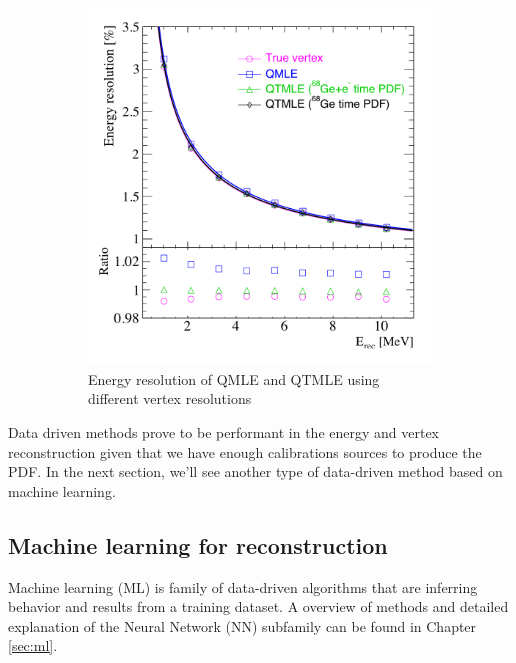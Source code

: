 \documentclass[../main.tex]{subfiles}
\begin{document}
\begin{figure}[ht]
\begin{subfigure}{0.48\linewidth}
    \includegraphics[width=\textwidth]{images/juno/reco/energy_qtmle.png}
    \caption{Energy resolution of QMLE and QTMLE using different vertex resolutions}
  \end{subfigure}
  \caption{}
  \label{fig:juno:rec:qtmle}
\end{figure}

Data driven methods prove to be performant in the energy and vertex reconstruction given that we have enough calibrations sources to produce the PDF. In the next section, we'll see another type of data-driven method based on machine learning.

\subsection{Machine learning for reconstruction}
\label{sec:juno:ml}

Machine learning (ML) is family of data-driven algorithms that are inferring behavior and results from a training dataset. A overview of methods and detailed explanation of the Neural Network (NN) subfamily can be found in Chapter \ref{sec:ml}.
\end{document}
